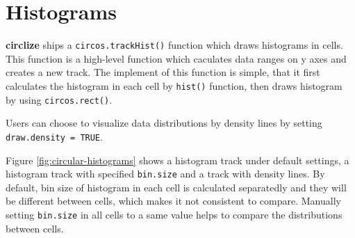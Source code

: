 \documentclass[]{book}
\newenvironment{Shaded}{\begin{snugshade}}{\end{snugshade}}
\newcommand{\KeywordTok}[1]{\textcolor[rgb]{0.13,0.29,0.53}{\textbf{#1}}}
\newcommand{\DataTypeTok}[1]{\textcolor[rgb]{0.13,0.29,0.53}{#1}}
\newcommand{\DecValTok}[1]{\textcolor[rgb]{0.00,0.00,0.81}{#1}}
\newcommand{\FloatTok}[1]{\textcolor[rgb]{0.00,0.00,0.81}{#1}}
\newcommand{\StringTok}[1]{\textcolor[rgb]{0.31,0.60,0.02}{#1}}
\newcommand{\OtherTok}[1]{\textcolor[rgb]{0.56,0.35,0.01}{#1}}
\newcommand{\OperatorTok}[1]{\textcolor[rgb]{0.81,0.36,0.00}{\textbf{#1}}}
\newcommand{\NormalTok}[1]{#1}
\begin{document}
\section{Histograms}\label{histograms}

\textbf{circlize} ships a \texttt{circos.trackHist()} function which
draws histograms in cells. This function is a high-level function which
caculates data ranges on y axes and creates a new track. The implement
of this function is simple, that it first calculates the histogram in
each cell by \texttt{hist()} function, then draws histogram by using
\texttt{circos.rect()}.

Users can choose to visualize data distributions by density lines by
setting \texttt{draw.density\ =\ TRUE}.

Figure \ref{fig:circular-histograms} shows a histogram track under
default settings, a histogram track with specified \texttt{bin.size} and
a track with density lines. By default, bin size of histogram in each
cell is calculated separatedly and they will be different between cells,
which makes it not consistent to compare. Manually setting
\texttt{bin.size} in all cells to a same value helps to compare the
distributions between cells.

\begin{Shaded}
\end{Shaded}
\end{document}

